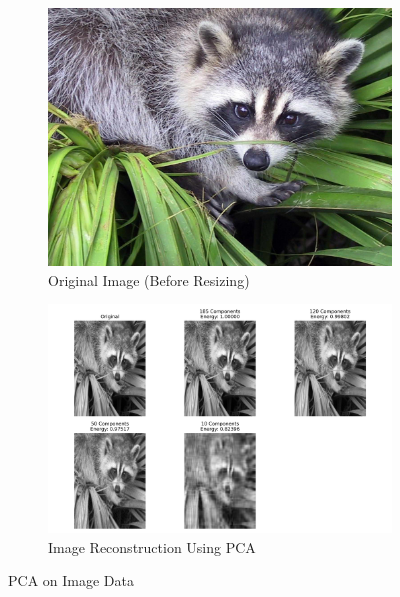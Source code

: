 \begin{itemize}
\begin{figure}[H]
    \centering
    \begin{subfigure}[b]{0.5\textwidth}
        \centering
        \includegraphics[width=\textwidth]{images/ex3task1-2-1.jpg}
        \caption{Original Image (Before Resizing)}
        \label{fig:original_image}
    \end{subfigure}
    \begin{subfigure}[b]{0.7\textwidth}
        \centering
        \includegraphics[width=\textwidth]{images/ex3task1-2-2.png}
        \caption{Image Reconstruction Using PCA}
        \label{fig:pca_reconstruction}
    \end{subfigure}
    \caption{PCA on Image Data}
    \label{fig:part2}
\end{figure}


\end{itemize}
